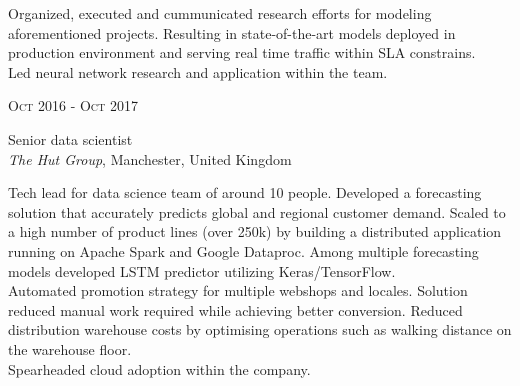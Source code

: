 \documentclass[10pt]{article} %
\begin{document}
{\begin{minipage}[t]{0.5\textwidth}
{Organized, executed and cummunicated research efforts for modeling aforementioned projects. Resulting in state-of-the-art models deployed in production environment and serving real time traffic within SLA constrains.
\\

Led neural network research and application within the team.
}\\



\vspace{0.5cm}
{\raggedleft\textsc{Oct 2016 - Oct 2017}\par}

{\raggedright\large Senior data scientist\\
\textit{The Hut Group}, Manchester, United Kingdom\\[5pt]}

\normalsize{Tech lead for data science team of around 10 people. 
Developed a forecasting solution that accurately predicts global 
and regional customer demand. Scaled to a high number of product 
lines (over 250k) by building a distributed application running 
on Apache Spark and Google Dataproc. Among multiple forecasting models 
developed LSTM predictor utilizing Keras/TensorFlow.
\\

Automated promotion strategy for multiple webshops and locales. 
Solution reduced manual work required while achieving better conversion.
Reduced distribution warehouse costs by optimising operations such 
as walking distance on the warehouse floor.
\\

Spearheaded cloud adoption within the company.}\\



\end{minipage} %
\hfill
\begin{minipage}[t]{0.44\textwidth} %
\vspace{0pt} %



\end{minipage}}
\end{document}
